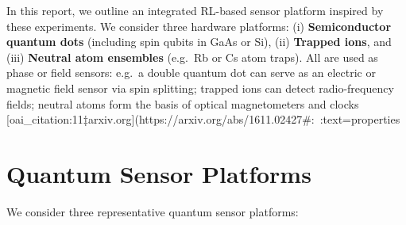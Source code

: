 \documentclass[12pt]{article}
\begin{document}
In this report, we outline an integrated RL-based sensor platform inspired by these experiments.  We consider three hardware platforms: (i) {\bf Semiconductor quantum dots} (including spin qubits in GaAs or Si), (ii) {\bf Trapped ions}, and (iii) {\bf Neutral atom ensembles} (e.g.\ Rb or Cs atom traps).  All are used as phase or field sensors: e.g.\ a double quantum dot can serve as an electric or magnetic field sensor via spin splitting; trapped ions can detect radio-frequency fields; neutral atoms form the basis of optical magnetometers and clocks [oai_citation:11‡arxiv.org](https://arxiv.org/abs/1611.02427#:~:text=properties%

\section{Quantum Sensor Platforms}
We consider three representative quantum sensor platforms:
\end{document}

